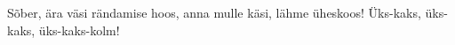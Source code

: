 S\~ober, \"ara v\"asi r\"andamise hoos,
anna mulle k\"asi, l\"ahme \"uheskoos!
\"Uks-kaks, \"uks-kaks, \"uks-kaks-kolm!